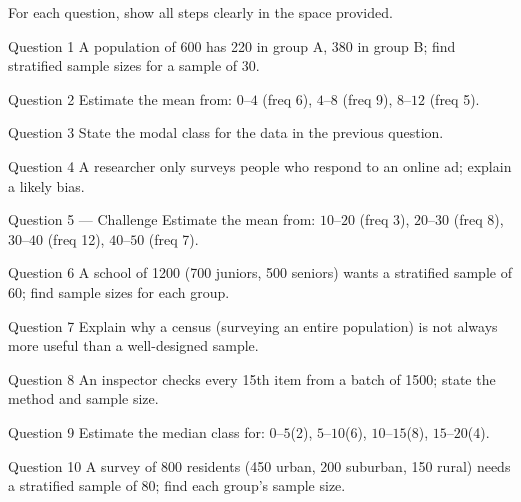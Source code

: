 \documentclass[11pt]{article}
\begin{document}
\clearpage
{}
For each question, show all steps clearly in the space provided.

\begin{qbox}{Question 1}
A population of 600 has 220 in group A, 380 in group B; find stratified sample sizes for a sample of 30.\workspace{2.4cm}
\end{qbox}

\begin{qbox}{Question 2}
Estimate the mean from: $0$--$4$ (freq 6), $4$--$8$ (freq 9), $8$--$12$ (freq 5).\workspace{2.4cm}
\end{qbox}

\begin{qbox}{Question 3}
State the modal class for the data in the previous question.\workspace{2.4cm}
\end{qbox}

\begin{qbox}{Question 4}
A researcher only surveys people who respond to an online ad; explain a likely bias.\workspace{2.4cm}
\end{qbox}

\begin{qbox}{Question 5 --- Challenge}
Estimate the mean from: $10$--$20$ (freq 3), $20$--$30$ (freq 8), $30$--$40$ (freq 12), $40$--$50$ (freq 7).\workspace{3cm}
\end{qbox}

\begin{qbox}{Question 6}
A school of 1200 (700 juniors, 500 seniors) wants a stratified sample of 60; find sample sizes for each group.\workspace{2.4cm}
\end{qbox}

\begin{qbox}{Question 7}
Explain why a census (surveying an entire population) is not always more useful than a well-designed sample.\workspace{2.4cm}
\end{qbox}

\begin{qbox}{Question 8}
An inspector checks every 15th item from a batch of 1500; state the method and sample size.\workspace{2.4cm}
\end{qbox}

\begin{qbox}{Question 9}
Estimate the median class for: $0$--$5$(2), $5$--$10$(6), $10$--$15$(8), $15$--$20$(4).\workspace{2.4cm}
\end{qbox}

\begin{qbox}{Question 10}
A survey of 800 residents (450 urban, 200 suburban, 150 rural) needs a stratified sample of 80; find each group's sample size.\workspace{2.4cm}
\end{qbox}
\end{document}
